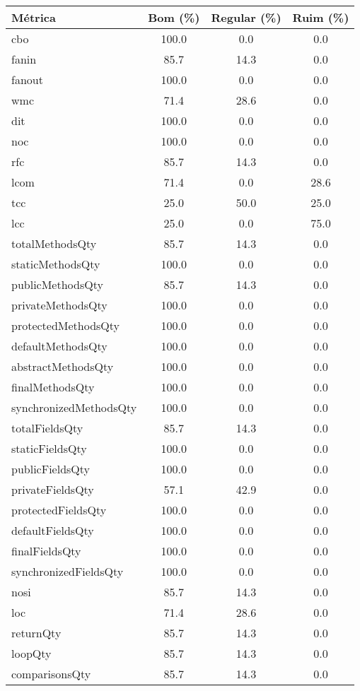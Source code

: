 \begin{tabular}{lccc}
                \toprule
                \textbf{Métrica} & \textbf{Bom (\%)} & \textbf{Regular (\%)} & \textbf{Ruim (\%)} \\
                \midrule
                cbo & 100.0 & 0.0 & 0.0 \\
fanin & 85.7 & 14.3 & 0.0 \\
fanout & 100.0 & 0.0 & 0.0 \\
wmc & 71.4 & 28.6 & 0.0 \\
dit & 100.0 & 0.0 & 0.0 \\
noc & 100.0 & 0.0 & 0.0 \\
rfc & 85.7 & 14.3 & 0.0 \\
lcom & 71.4 & 0.0 & 28.6 \\
tcc & 25.0 & 50.0 & 25.0 \\
lcc & 25.0 & 0.0 & 75.0 \\
totalMethodsQty & 85.7 & 14.3 & 0.0 \\
staticMethodsQty & 100.0 & 0.0 & 0.0 \\
publicMethodsQty & 85.7 & 14.3 & 0.0 \\
privateMethodsQty & 100.0 & 0.0 & 0.0 \\
protectedMethodsQty & 100.0 & 0.0 & 0.0 \\
defaultMethodsQty & 100.0 & 0.0 & 0.0 \\
abstractMethodsQty & 100.0 & 0.0 & 0.0 \\
finalMethodsQty & 100.0 & 0.0 & 0.0 \\
synchronizedMethodsQty & 100.0 & 0.0 & 0.0 \\
totalFieldsQty & 85.7 & 14.3 & 0.0 \\
staticFieldsQty & 100.0 & 0.0 & 0.0 \\
publicFieldsQty & 100.0 & 0.0 & 0.0 \\
privateFieldsQty & 57.1 & 42.9 & 0.0 \\
protectedFieldsQty & 100.0 & 0.0 & 0.0 \\
defaultFieldsQty & 100.0 & 0.0 & 0.0 \\
finalFieldsQty & 100.0 & 0.0 & 0.0 \\
synchronizedFieldsQty & 100.0 & 0.0 & 0.0 \\
nosi & 85.7 & 14.3 & 0.0 \\
loc & 71.4 & 28.6 & 0.0 \\
returnQty & 85.7 & 14.3 & 0.0 \\
loopQty & 85.7 & 14.3 & 0.0 \\
comparisonsQty & 85.7 & 14.3 & 0.0 \\

\end{tabular}

